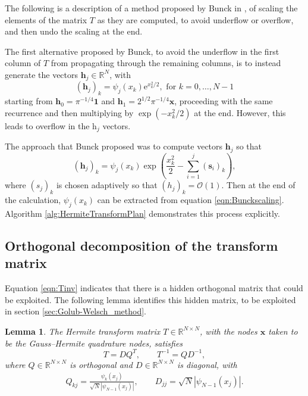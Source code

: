 \documentclass[10pt]{article}
\numberwithin{theorem}{section}
\newtheorem{lemma}[theorem]{Lemma}
\begin{document}
 The following is a description of a method proposed by Bunck in \cite[Appendix]{bunck2009fast}, of scaling the elements of the matrix $T$ as they are computed, to avoid underflow or overflow, and then undo the scaling at the end. 
 
The first alternative proposed by Bunck, to avoid the underflow in the first column of $T$ from propagating through the remaining columns, is to instead generate the vectors $\mathbf{h}_j\in\mathbb{R}^N$, with $$\left(\mathbf{h}_j\right)_k = \psi_j(x_k)\mathrm{e}^{x_k^2/2}, \text{ for } k = 0,\ldots, N{-}1$$ starting from $\mathbf{h}_0 = \pi^{-1/4} \mathbf{1}$ and $\mathbf{h}_1 = 2^{1/2}\pi^{-1/4} \mathbf{x}$, proceeding with the same recurrence and then multiplying by $\exp(-x_k^2/2)$ at the end. However, this leads to overflow in the $\mathrm{h}_j$ vectors.

The approach that Bunck proposed was to compute vectors $\mathbf{h}_j$ so that
\begin{equation}\label{eqn:Bunckscaling}
    \left(\mathbf{h}_j\right)_k = \psi_j(x_k)\exp\left(\frac{x_k^2}{2} - \sum_{i=1}^j \left(\mathbf{s}_i\right)_k \right),
\end{equation}
where $(s_j)_k$ is chosen adaptively so that $(h_j)_k = \mathcal{O}(1)$. Then at the end of the calculation, $\psi_j(x_k)$ can be extracted from equation \eqref{eqn:Bunckscaling}. Algorithm \ref{alg:HermiteTransformPlan} demonstrates this process explicitly.

\subsection{Orthogonal decomposition of the transform matrix}

Equation \eqref{eqn:Tinv} indicates that there is a hidden orthogonal matrix that could be exploited. The following lemma identifies this hidden matrix, to be exploited in section \ref{sec:Golub-Welsch_method}.

\begin{lemma}\label{lem:orth}
The Hermite transform matrix $T \in \mathbb{R}^{N\times N}$, with the nodes $\mathbf{x}$ taken to be the Gauss--Hermite quadrature nodes, satisfies
\begin{equation}
    T = DQ^T, \qquad T^{-1} = Q D^{-1},
\end{equation}
where $Q \in \mathbb{R}^{N\times N}$ is orthogonal and $D \in \mathbb{R}^{N\times N}$ is diagonal, with
\begin{align*}
    {Q}_{kj} = \frac{\psi_k(x_j)}{\sqrt{N} \left|\psi_{N{-}1}(x_j)\right|}, \qquad {D}_{jj} = \sqrt{N}\left|\psi_{N{-}1}(x_j)\right|.
\end{align*}
\end{lemma}
\end{document}
